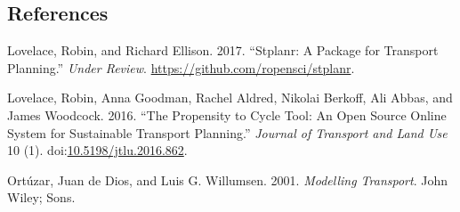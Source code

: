 \documentclass[11pt]{article}
\begin{document}
\subsection*{References}\label{references}

\hypertarget{refs}{}
\hypertarget{ref-lovelace_stplanr:_2017}{}
Lovelace, Robin, and Richard Ellison. 2017. ``Stplanr: A Package for
Transport Planning.'' \emph{Under Review}.
\url{https://github.com/ropensci/stplanr}.

\hypertarget{ref-lovelace_propensity_2016}{}
Lovelace, Robin, Anna Goodman, Rachel Aldred, Nikolai Berkoff, Ali
Abbas, and James Woodcock. 2016. ``The Propensity to Cycle Tool: An Open
Source Online System for Sustainable Transport Planning.'' \emph{Journal
of Transport and Land Use} 10 (1).
doi:\href{https://doi.org/10.5198/jtlu.2016.862}{10.5198/jtlu.2016.862}.

\hypertarget{ref-ortuzar_modelling_2001}{}
Ortúzar, Juan de Dios, and Luis G. Willumsen. 2001. \emph{Modelling
Transport}. John Wiley; Sons.
\end{document}
